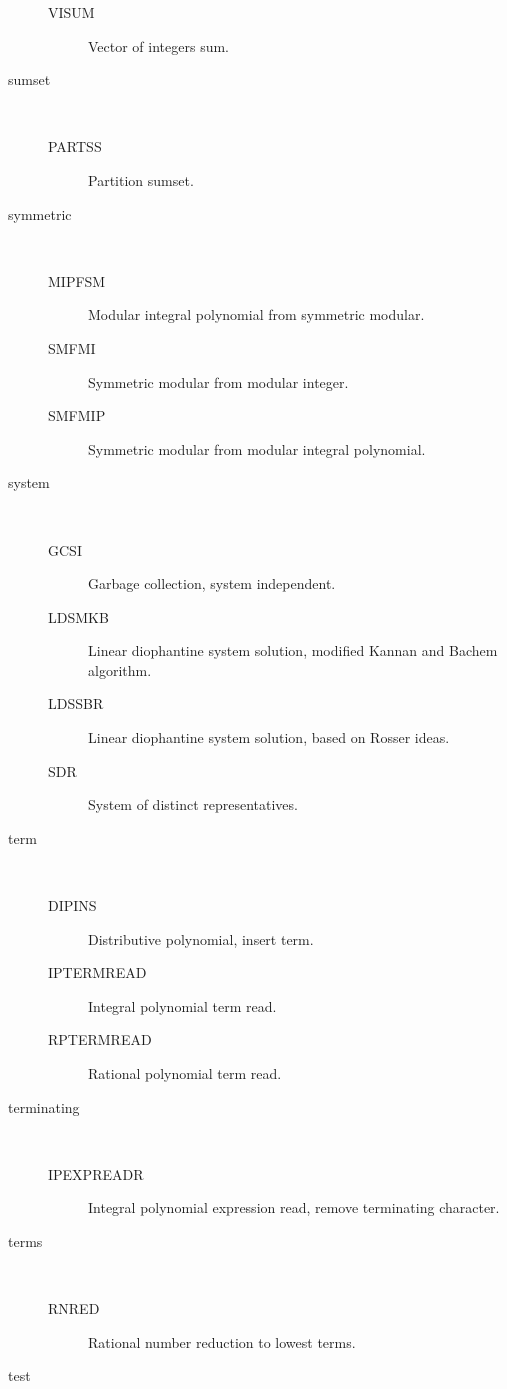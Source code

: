 \begin{description}
\begin{description}
  \item[VISUM]  Vector of integers sum.
  \end{description}
\item[sumset] \ \ 
  \begin{description}
  \item[PARTSS]  Partition sumset.
  \end{description}
\item[symmetric] \ \ 
  \begin{description}
  \item[MIPFSM]  Modular integral polynomial from symmetric modular.
  \item[SMFMI]  Symmetric modular from modular integer.
  \item[SMFMIP]  Symmetric modular from modular integral polynomial.
  \end{description}
\item[system] \ \ 
  \begin{description}
  \item[GCSI]  Garbage collection, system independent.
  \item[LDSMKB]  Linear diophantine system solution, modified Kannan and
    Bachem algorithm.
  \item[LDSSBR]  Linear diophantine system solution, based on Rosser ideas.
  \item[SDR]  System of distinct representatives.
  \end{description}
\item[term] \ \ 
  \begin{description}
  \item[DIPINS]  Distributive polynomial, insert term.
  \item[IPTERMREAD]  Integral polynomial term read.
  \item[RPTERMREAD]  Rational polynomial term read.
  \end{description}
\item[terminating] \ \ 
  \begin{description}
  \item[IPEXPREADR]  Integral polynomial expression read, remove terminating
    character.
  \end{description}
\item[terms] \ \ 
  \begin{description}
  \item[RNRED]  Rational number reduction to lowest terms.
  \end{description}
\item[test] \ \ 

\end{description}
